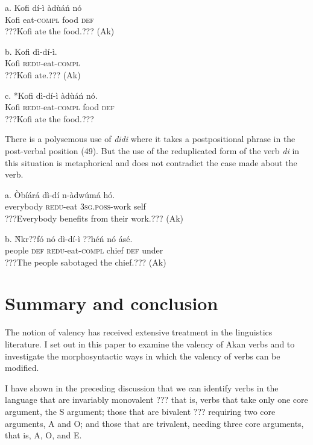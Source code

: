 \documentclass[output=paper]{langsci/langscibook}
\begin{document}
\ea
\gll a.  Kofi  dí-ì    àd\`{u}áń    nó\\
       Kofi  eat-\textsc{compl}  food    \textsc{def}\\
\glt   ???Kofi ate the food.??? (Ak)
\z

\ea
\gll  b.  Kofi  dì-dí-ì.\\
       Kofi  \textsc{redu}{}-eat-\textsc{compl}\\
\glt   ???Kofi ate.??? (Ak)
\z

\ea
\gll  c.  *Kofi  dì-dí-ì      àd\`{u}áń    nó.\\
       Kofi  \textsc{redu}{}-eat-\textsc{compl}  food    \textsc{def}\\
\glt   ???Kofi ate the food.???
\z

There is a polysemous use of \emph{didi} where it takes a postpositional phrase in the post-verbal position (49). But the use of the reduplicated form of the verb \emph{di} in this situation is metaphorical and does not contradict the case made about the verb.

\ea
\gll a.  \`{O}bíárá    dì-dí    n-àdwúmá    hó.\\
       everybody  \textsc{redu}{}-eat  \textsc{3sg.poss}{}-work  self\\
\glt   ???Everybody benefits from their work.??? (Ak)
\z

\ea
\gll  b.  \`{N}kr??fó  nó  dì-dí-ì      ??héń   nó  ásé.\\
       people  \textsc{def}  \textsc{redu}{}-eat-\textsc{compl}  chief  \textsc{def}  under\\
\glt   ???The people sabotaged the chief.??? (Ak)
\z

\section{Summary and conclusion}

The notion of valency has received extensive treatment in the linguistics literature. I set out in this paper to examine the valency of Akan verbs and to investigate the morphosyntactic ways in which the valency of verbs can be modified. 

I have shown in the preceding discussion that we can identify verbs in the language that are invariably monovalent ??? that is, verbs that take only one core argument, the S argument; those that are bivalent ??? requiring two core arguments, A and O; and those that are trivalent, needing three core arguments, that is, A, O, and E.
\end{document}
